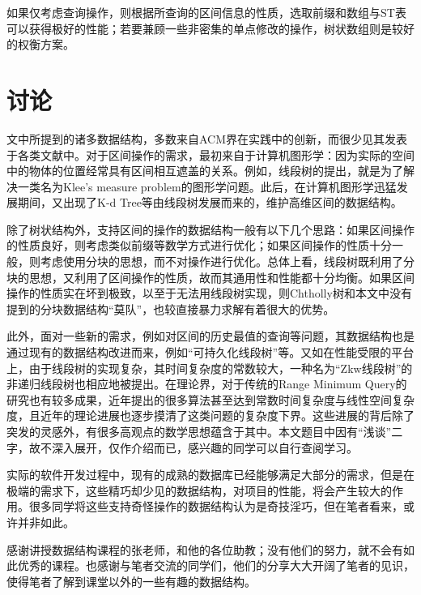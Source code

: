 \documentclass{cjc}
\begin{document}
如果仅考虑查询操作，则根据所查询的区间信息的性质，选取前缀和数组与ST表可以获得极好的性能；若要兼顾一些非密集的单点修改的操作，树状数组则是较好的权衡方案。

\section{讨论}

文中所提到的诸多数据结构，多数来自ACM界在实践中的创新，而很少见其发表于各类文献中。对于区间操作的需求，最初来自于计算机图形学：因为实际的空间中的物体的位置经常具有区间相互遮盖的关系。例如，线段树的提出，就是为了解决一类名为Klee's measure problem的图形学问题。此后，在计算机图形学迅猛发展期间，又出现了K-d Tree等由线段树发展而来的，维护高维区间的数据结构。

除了树状结构外，支持区间的操作的数据结构一般有以下几个思路：如果区间操作的性质良好，则考虑类似前缀等数学方式进行优化；如果区间操作的性质十分一般，则考虑使用分块的思想，而不对操作进行优化。总体上看，线段树既利用了分块的思想，又利用了区间操作的性质，故而其通用性和性能都十分均衡。如果区间操作的性质实在坏到极致，以至于无法用线段树实现，则Chtholly树和本文中没有提到的分块数据结构“莫队”，也较直接暴力求解有着很大的优势。

此外，面对一些新的需求，例如对区间的历史最值的查询等问题，其数据结构也是通过现有的数据结构改进而来，例如“可持久化线段树”等。又如在性能受限的平台上，由于线段树的实现复杂，其时间复杂度的常数较大，一种名为“Zkw线段树”的非递归线段树也相应地被提出。在理论界，对于传统的Range Minimum Query的研究也有较多成果，近年提出的很多算法甚至达到常数时间复杂度与线性空间复杂度，且近年的理论进展也逐步摸清了这类问题的复杂度下界。这些进展的背后除了突发的灵感外，有很多高观点的数学思想蕴含于其中。本文题目中因有“浅谈”二字，故不深入展开，仅作介绍而已，感兴趣的同学可以自行查阅学习。

实际的软件开发过程中，现有的成熟的数据库已经能够满足大部分的需求，但是在极端的需求下，这些精巧却少见的数据结构，对项目的性能，将会产生较大的作用。很多同学将这些支持奇怪操作的数据结构认为是奇技淫巧，但在笔者看来，或许并非如此。


\begin{acknowledgments}
  感谢讲授数据结构课程的张老师，和他的各位助教；没有他们的努力，就不会有如此优秀的课程。也感谢与笔者交流的同学们，他们的分享大大开阔了笔者的见识，使得笔者了解到课堂以外的一些有趣的数据结构。
\end{acknowledgments}


\nocite{*}



\end{document}
